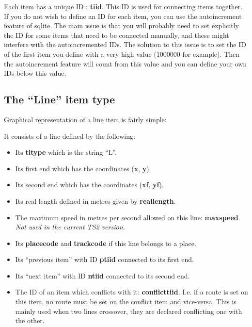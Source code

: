 \documentclass[12pt,a4paper]{article}
\begin{document}
Each item has a unique ID : \textbf{tiid}. This ID is used for connecting items together. If you do not wish to define an ID for each item, you can use the autoincrement feature of sqlite. The main issue is that you will probably need to set explicitly the ID for some items that need to be connected manually, and these might interfere with the autoincremented IDs. The solution to this issue is to set the ID of the first item you define with a very high value (1000000 for example). Then the autoincrement feature will count from this value and you can define your own IDs below this value.

\subsection{The ``Line'' item type}
Graphical representation of a line item is fairly simple:

\begin{center}
\end{center}

It consists of a line defined by the following:

\begin{itemize}
 \item Its \textbf{titype} which is the string ``L''.
 \item Its first end which has the coordinates (\textbf{x}, \textbf{y}).
 \item Its second end which has the coordinates (\textbf{xf}, \textbf{yf}).
 \item Its real length defined in metres given by \textbf{reallength}.
 \item The maximum speed in metres per second allowed on this line: \textbf{maxspeed}. \textit{Not used in the current TS2 version.}
 \item Its \textbf{placecode} and \textbf{trackcode} if this line belongs to a place.
 \item Its ``previous item'' with ID \textbf{ptiid} connected to its first end.
 \item Its ``next item'' with ID \textbf{ntiid} connected to its second end.
 \item The ID of an item which conflicts with it: \textbf{conflicttiid}. I.e. if a route is set on this item, no route must be set on the conflict item and vice-versa. This is mainly used when two lines crossover, they are declared conflicting one with the other.
\end{itemize}
\end{document}
